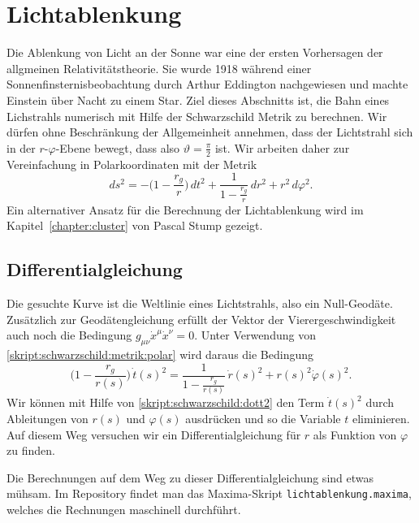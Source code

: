 %
%
%
\section{Lichtablenkung}
%
Die Ablenkung von Licht an der Sonne war eine der ersten Vorhersagen der
allgmeinen Relativitätstheorie.
Sie wurde 1918 während einer Sonnenfinsternisbeobachtung durch
Arthur Eddington nachgewiesen und machte Einstein über Nacht zu einem Star.
%
Ziel dieses Abschnitts ist, die Bahn eines Lichstrahls numerisch
mit Hilfe der Schwarzschild Metrik zu berechnen.
Wir dürfen ohne Beschränkung der Allgemeinheit annehmen, dass der Lichtstrahl
sich in der $r$-$\varphi$-Ebene bewegt, dass also $\vartheta=\frac\pi2$ ist.
Wir arbeiten daher zur Vereinfachung in Polarkoordinaten mit der Metrik
\begin{equation}
ds^2
=
-\biggl(1-\frac{r_g}{r}\biggr)\,dt^2
+ \frac{1}{\displaystyle 1-\frac{r_g}{r}}\,dr^2
+ r^2\,d\varphi^2.
\label{skript:schwarzschild:metrik:polar}
\end{equation}
Ein alternativer Ansatz für die Berechnung der Lichtablenkung wird im
Kapitel~\ref{chapter:cluster} von Pascal Stump gezeigt.

\subsection{Differentialgleichung%
\label{skript:lichtablenkung:dgl}}
Die gesuchte Kurve ist die Weltlinie eines Lichtstrahls, also ein Null-Geodäte. 
Zusätzlich zur Geodätengleichung erfüllt der Vektor der Vierergeschwindigkeit
auch noch die Bedingung $g_{\mu\nu}\dot x^\mu \dot x^\nu=0$.
Unter Verwendung von \eqref{skript:schwarzschild:metrik:polar}
wird daraus die Bedingung
\begin{equation}
\biggl(1-\frac{r_g}{r(s)}\biggr)\,\dot t(s)^2
=
\frac{1}{\displaystyle 1-\frac{r_g}{r(s)}}\,\dot r(s)^2
+ r(s)^2\dot \varphi(s)^2.
\label{skript:schwarzschild:dott2}
\end{equation}
Wir können mit Hilfe von \eqref{skript:schwarzschild:dott2}
den Term $\dot t(s)^2$ durch Ableitungen von $r(s)$ und $\varphi(s)$
ausdrücken und so die Variable $t$ eliminieren.
Auf diesem Weg versuchen wir ein Differentialgleichung für $r$
als Funktion von $\varphi$ zu finden.

Die Berechnungen auf dem Weg zu dieser Differentialgleichung sind
etwas mühsam.
Im Repository findet man das Maxima-Skript \texttt{lichtablenkung.maxima},
welches die Rechnungen maschinell durchführt.


